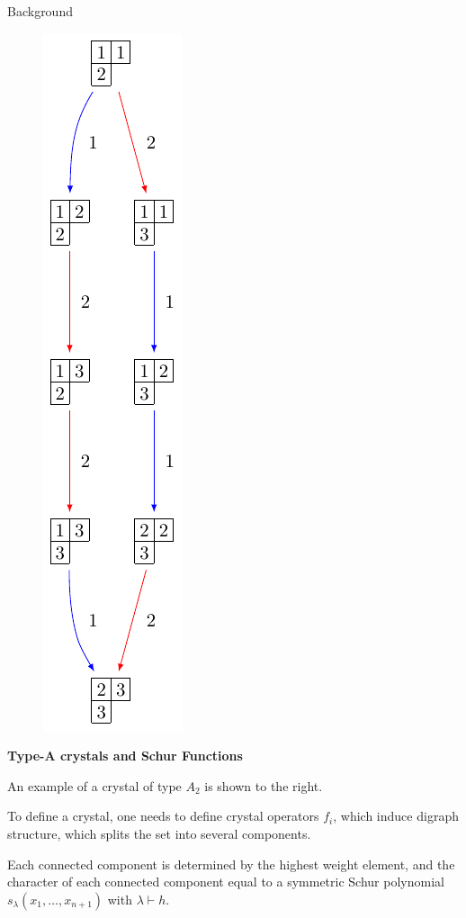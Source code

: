 \documentclass[final]{beamer}
\theoremstyle{definition}
\numberwithin{equation}{section}
\newlength{\onecolwid}
\newlength{\twocolwid}
\begin{document}
\begin{frame}[t]
\begin{columns}[t]
\begin{column}{\twocolwid}
\begin{columns}[t]
\begin{column}{\onecolwid}
\begin{block}{Background}
\begin{figure}
\includegraphics[scale=1.6]{Crystal_Young}
\centering
\end{figure}

\textbf{Type-A crystals and Schur Functions}\vskip 10pt

An example of a crystal of type $A_2$ is shown to the right.

To define a crystal, one needs to define crystal operators $f_i$, which induce digraph structure, which splits the set into several components.

Each connected component is determined by the highest weight element, and the character of each connected component equal to a symmetric Schur polynomial $s_{\lambda}(x_1,\ldots,x_{n+1})$ with $\lambda\vdash h$.


\end{block}
\end{column}
\end{columns}
\end{column}
\end{columns}
\end{frame}
\end{document}
